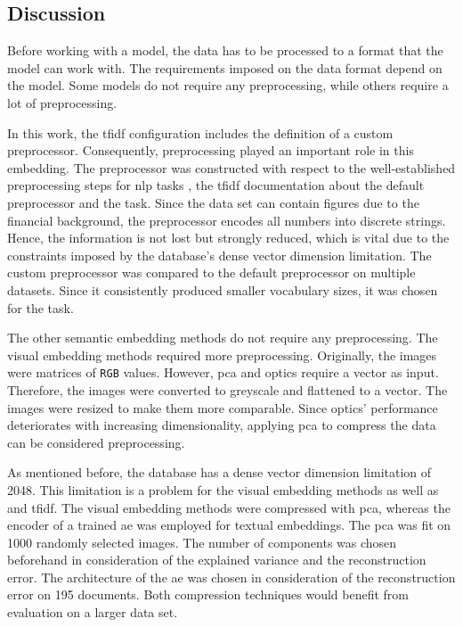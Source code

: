 \subsection{Discussion}\label{subsec:discussion}

Before working with a model, the data has to be processed to a format that the model can work with.
The requirements imposed on the data format depend on the model.
Some models do not require any preprocessing, while others require a lot of preprocessing.

In this work, the \ac{tfidf} configuration includes the definition of a custom preprocessor.
Consequently, preprocessing played an important role in this embedding.
The preprocessor was constructed with respect to the well-established preprocessing steps for \ac{nlp} tasks \cite{nlp-book2009},
the \ac{tfidf} documentation about the default preprocessor and the task.
Since the data set can contain figures due to the financial background, the preprocessor encodes all numbers into discrete strings.
Hence, the information is not lost but strongly reduced, which is vital due to the constraints imposed 
by the database's dense vector dimension limitation.
The custom preprocessor was compared to the default preprocessor on multiple datasets.
Since it consistently produced smaller vocabulary sizes, it was chosen for the task.

The other semantic embedding methods do not require any preprocessing.
The visual embedding methods required more preprocessing.
Originally, the images were matrices of \texttt{RGB} values.
However, \ac{pca} and \ac{optics} require a vector as input.
Therefore, the images were converted to greyscale and flattened to a vector.
The images were resized to make them more comparable.
Since \ac{optics}' performance deteriorates with increasing dimensionality, 
applying \ac{pca} to compress the data can be considered preprocessing.


As mentioned before, the database has a dense vector dimension limitation of 2048.
This limitation is a problem for the visual embedding methods as well as \infersent{} and 
\ac{tfidf}.
The visual embedding methods were compressed with \ac{pca}, 
whereas the encoder of a trained \ac{ae} was employed for textual embeddings.
The \ac{pca} was fit on 1000 randomly selected images.
The number of components was chosen beforehand in consideration of the explained variance and the reconstruction error.
The architecture of the \ac{ae} was chosen in consideration of the reconstruction error on 195 documents.
Both compression techniques would benefit from evaluation on a larger data set.


